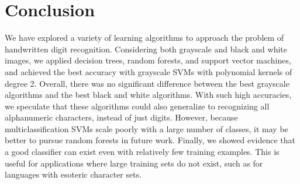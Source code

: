\documentclass[12pt]{article}
\begin{document}
\section*{Conclusion}
We have explored a variety of learning algorithms to approach the problem of handwritten digit recognition. Considering both grayscale and black and white images, we applied decision trees, random forests, and support vector machines, and achieved the best accuracy with grayscale SVMs with polynomial kernels of degree 2. Overall, there was no significant difference between the best grayscale algorithms and the best black and white algorithms. With such high accuracies, we speculate that these algorithms could also generalize to recognizing all alphanumeric characters, instead of just digits. However, because multiclassification SVMs scale poorly with a large number of classes, it may be better to pursue random forests in future work. Finally, we showed evidence that a good classifier can exist even with relatively few training examples. This is useful for applications where large training sets do not exist, such as for languages with esoteric character sets.
\end{document}
